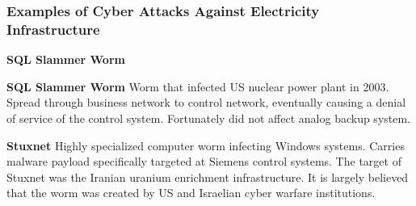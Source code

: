 \subsubsection{Examples of Cyber Attacks Against Electricity Infrastructure}
\begin{labeling}{\textbf{SQL Slammer Worm}}
    \item [\textbf{SQL Slammer Worm}]
    Worm that infected US nuclear power plant in 2003.
    Spread through business network to control network, eventually causing a denial of service of the control system.
    Fortunately did not affect analog backup system.
    \item [\textbf{Stuxnet}]
    Highly specialized computer worm infecting Windows systems. Carries malware payload specifically targeted at Siemens control systems.
    The target of Stuxnet was the Iranian uranium enrichment infrastructure.
    It is largely believed that the worm was created by US and Israelian cyber warfare institutions.
\end{labeling}
